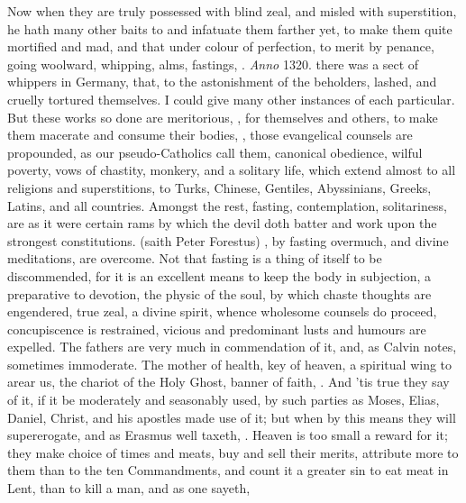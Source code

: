 {Now when they are truly possessed with blind zeal, and misled with
superstition, he hath many other baits to  and infatuate them
farther yet, to make them quite mortified and mad, and that under
colour of perfection, to merit by penance, going woolward, whipping,
alms, fastings, \etc{}. \emph{Anno} 1320. there was a sect of whippers in
Germany, that, to the astonishment of the beholders, lashed, and
cruelly tortured themselves. I could give many other instances of each
particular. But these works so done are meritorious, , for themselves and others, to make them macerate and
consume their bodies, , those evangelical
counsels are propounded, as our pseudo-Catholics call them, canonical
obedience, wilful poverty, vows of chastity, monkery, and a
solitary life, which extend almost to all religions and superstitions,
to Turks, Chinese, Gentiles, Abyssinians, Greeks, Latins, and all
countries. Amongst the rest, fasting, contemplation, solitariness, are
as it were certain rams by which the devil doth batter and work upon
the strongest constitutions.  (saith Peter Forestus) , by fasting overmuch, and divine meditations, are
overcome. Not that fasting is a thing of itself to be discommended, for
it is an excellent means to keep the body in subjection, a preparative
to devotion, the physic of the soul, by which chaste thoughts are
engendered, true zeal, a divine spirit, whence wholesome counsels do
proceed, concupiscence is restrained, vicious and predominant lusts and
humours are expelled. The fathers are very much in commendation of it,
and, as Calvin notes, sometimes immoderate. The mother of health,
key of heaven, a spiritual wing to arear us, the chariot of the Holy
Ghost, banner of faith, \etc{}. And 'tis true they say of it, if it be
moderately and seasonably used, by such parties as Moses, Elias,
Daniel, Christ, and his apostles made use of it; but when by this
means they will supererogate, and as Erasmus well taxeth, . Heaven is too small a reward for it;
they make choice of times and meats, buy and sell their merits,
attribute more to them than to the ten Commandments, and count it a
greater sin to eat meat in Lent, than to kill a man, and as one sayeth,
}
